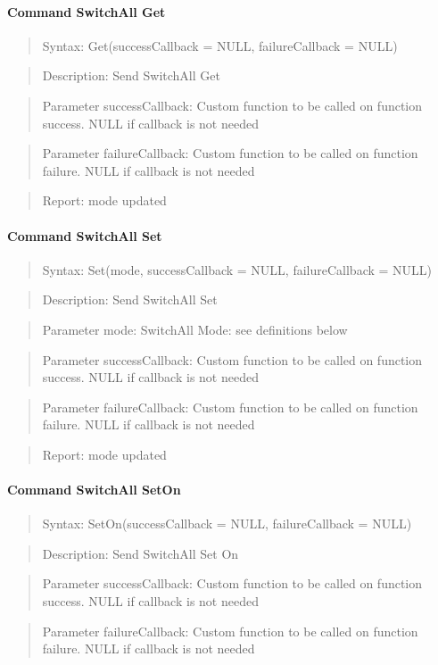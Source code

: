 \paragraph{Command SwitchAll Get}
\begin{quote}Syntax: Get(successCallback = NULL, failureCallback = NULL)\end{quote}
\begin{quote}Description: Send SwitchAll Get\end{quote}
\begin{quote}Parameter successCallback: Custom function to be called on function success. NULL if callback is not needed\end{quote}
\begin{quote}Parameter failureCallback: Custom function to be called on function failure. NULL if callback is not needed\end{quote}
\begin{quote}Report: mode updated\end{quote}

\paragraph{Command SwitchAll Set}
\begin{quote}Syntax: Set(mode, successCallback = NULL, failureCallback = NULL)\end{quote}
\begin{quote}Description: Send SwitchAll Set\end{quote}
\begin{quote}Parameter mode: SwitchAll Mode: see definitions below\end{quote}
\begin{quote}Parameter successCallback: Custom function to be called on function success. NULL if callback is not needed\end{quote}
\begin{quote}Parameter failureCallback: Custom function to be called on function failure. NULL if callback is not needed\end{quote}
\begin{quote}Report: mode updated\end{quote}

\paragraph{Command SwitchAll SetOn}
\begin{quote}Syntax: SetOn(successCallback = NULL, failureCallback = NULL)\end{quote}
\begin{quote}Description: Send SwitchAll Set On\end{quote}
\begin{quote}Parameter successCallback: Custom function to be called on function success. NULL if callback is not needed\end{quote}
\begin{quote}Parameter failureCallback: Custom function to be called on function failure. NULL if callback is not needed\end{quote}


